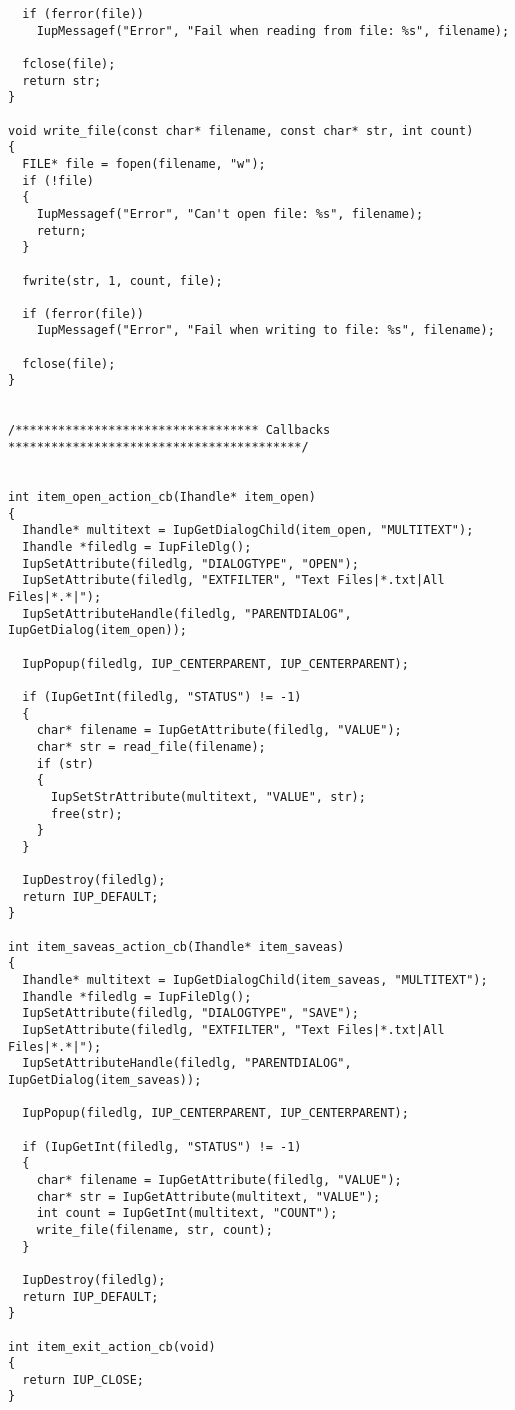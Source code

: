 \documentclass{ctexart}
\begin{document}
\begin{lstlisting}
  if (ferror(file))
    IupMessagef("Error", "Fail when reading from file: %s", filename);

  fclose(file);
  return str;
}

void write_file(const char* filename, const char* str, int count)
{
  FILE* file = fopen(filename, "w");
  if (!file)
  {
    IupMessagef("Error", "Can't open file: %s", filename);
    return;
  }

  fwrite(str, 1, count, file);

  if (ferror(file))
    IupMessagef("Error", "Fail when writing to file: %s", filename);

  fclose(file);
}


/********************************** Callbacks *****************************************/


int item_open_action_cb(Ihandle* item_open)
{
  Ihandle* multitext = IupGetDialogChild(item_open, "MULTITEXT");
  Ihandle *filedlg = IupFileDlg();
  IupSetAttribute(filedlg, "DIALOGTYPE", "OPEN");
  IupSetAttribute(filedlg, "EXTFILTER", "Text Files|*.txt|All Files|*.*|");
  IupSetAttributeHandle(filedlg, "PARENTDIALOG", IupGetDialog(item_open));

  IupPopup(filedlg, IUP_CENTERPARENT, IUP_CENTERPARENT);

  if (IupGetInt(filedlg, "STATUS") != -1)
  {
    char* filename = IupGetAttribute(filedlg, "VALUE");
    char* str = read_file(filename);
    if (str)
    {
      IupSetStrAttribute(multitext, "VALUE", str);
      free(str);
    }
  }

  IupDestroy(filedlg);
  return IUP_DEFAULT;
}

int item_saveas_action_cb(Ihandle* item_saveas)
{
  Ihandle* multitext = IupGetDialogChild(item_saveas, "MULTITEXT");
  Ihandle *filedlg = IupFileDlg();
  IupSetAttribute(filedlg, "DIALOGTYPE", "SAVE");
  IupSetAttribute(filedlg, "EXTFILTER", "Text Files|*.txt|All Files|*.*|");
  IupSetAttributeHandle(filedlg, "PARENTDIALOG", IupGetDialog(item_saveas));

  IupPopup(filedlg, IUP_CENTERPARENT, IUP_CENTERPARENT);

  if (IupGetInt(filedlg, "STATUS") != -1)
  {
    char* filename = IupGetAttribute(filedlg, "VALUE");
    char* str = IupGetAttribute(multitext, "VALUE");
    int count = IupGetInt(multitext, "COUNT");
    write_file(filename, str, count);
  }

  IupDestroy(filedlg);
  return IUP_DEFAULT;
}

int item_exit_action_cb(void)
{
  return IUP_CLOSE;
}


\end{lstlisting}
\end{document}
